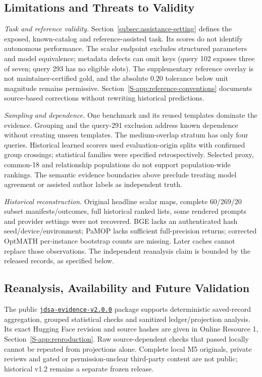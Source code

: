\documentclass[pdflatex,iicol,sn-basic,Numbered]{sn-jnl}
\begin{document}
\subsection{Limitations and Threats to Validity}
\label{subsec:limitations}
\emph{Task and reference validity.} Section~\ref{subsec:assistance-setting} defines the exposed, known-catalog and reference-assisted task. Its scores do not identify autonomous performance. The scalar endpoint excludes structured parameters and model equivalence; metadata defects can omit keys (query 102 exposes three of seven; query 293 has no eligible slots). The supplementary reference overlay is not maintainer-certified gold, and the absolute $0.20$ tolerance below unit magnitude remains permissive. Section~\ref{S-app:reference-conventions} documents source-based corrections without rewriting historical predictions.

\emph{Sampling and dependence.} One benchmark and its reused templates dominate the evidence. Grouping and the query-291 exclusion address known dependence without creating unseen templates. The medium-overlap stratum has only four queries. Historical learned scorers used evaluation-origin splits with confirmed group crossings; statistical families were specified retrospectively. Selected proxy, common-18 and relationship populations do not support population-wide rankings. The semantic evidence boundaries above preclude treating model agreement or assisted author labels as independent truth.

\emph{Historical reconstruction.} Original headline scalar maps, complete 60/269/20 subset manifests/outcomes, full historical ranked lists, some rendered prompts and provider settings were not recovered. BGE lacks an authenticated hash seed/device/environment; PaMOP lacks sufficient full-precision returns; corrected OptMATH per-instance bootstrap counts are missing. Later caches cannot replace those observations. The independent reanalysis claim is bounded by the released records, as specified below.

\subsection{Reanalysis, Availability and Future Validation}
\label{subsec:reanalysis}\label{subsec:future_work}\label{subsec:closed-audits}
The public \href{https://github.com/SoroushVahidi/combinatorial-opt-agent/releases/tag/jdsa-evidence-v2.0.0}{\texttt{jdsa-evidence-v2.0.0}} package supports deterministic saved-record aggregation, grouped statistical checks and sanitized ledger/projection analysis. Its exact Hugging Face revision and source hashes are given in Online Resource 1, Section~\ref{S-app:reproduction}. Raw source-dependent checks that passed locally cannot be repeated from projections alone. Complete local M5 originals, private reviews and gated or permission-unclear third-party content are not public; historical v1.2 remains a separate frozen release.
\end{document}
